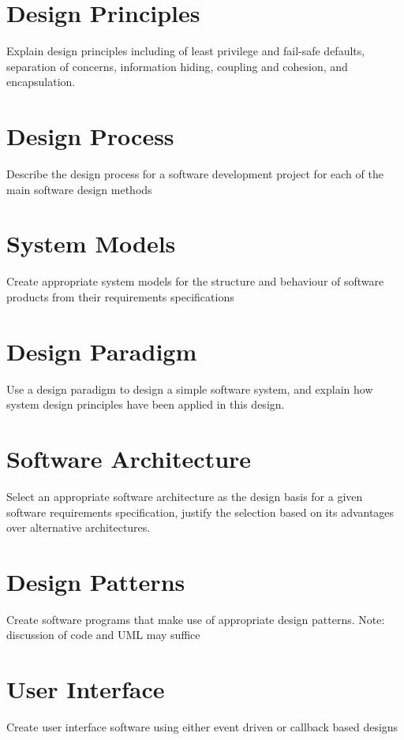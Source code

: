 \documentclass[12pt, a4]{report}
\begin{document}
	\par 
	
	\section{Design Principles}
	Explain design principles including of least privilege and fail-safe defaults, separation of concerns, information hiding, coupling and cohesion, and encapsulation.

	
	\section{Design Process}
	Describe the design process for a software development project for each of the main software design methods


	\section{System Models}
	Create appropriate system models for the structure and behaviour of software products from their requirements specifications


	\section{Design Paradigm}
	Use a design paradigm to design a simple software system, and explain how system design principles have been applied in this design.
	\par 

	\section{Software Architecture}
	Select an appropriate software architecture as the design basis for a given software requirements specification, justify the selection based on its advantages over alternative architectures.
	
	\section{Design Patterns}
	Create software programs that make use of appropriate design patterns.
	Note: discussion of code and UML may suffice 
	
	\section{User Interface}
	Create user interface software using either event driven or callback based designs
	
\end{document}
